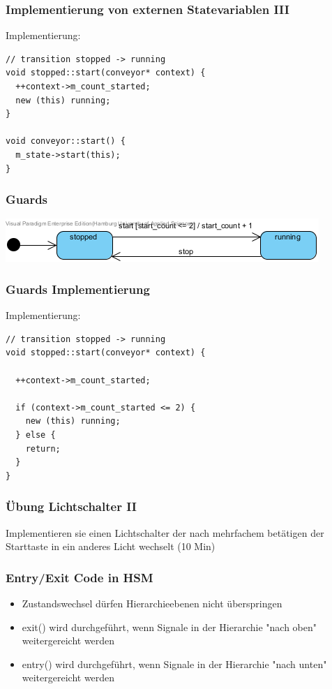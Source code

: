 \documentclass{beamer}
\begin{document}
\begin{frame}[fragile]
 \frametitle{Implementierung von externen Statevariablen III}
 Implementierung:
 \begin{lstlisting}
// transition stopped -> running
void stopped::start(conveyor* context) {
  ++context->m_count_started;
  new (this) running;
}

void conveyor::start() {
  m_state->start(this);
}
 \end{lstlisting}
\end{frame}

\begin{frame}
 \frametitle{Guards}
 \begin{center}
   \includegraphics[scale=.8]{img/fsm_gof_guard_automat.png}
 \end{center}
\end{frame}

\begin{frame}[fragile]
 \frametitle{Guards Implementierung}
 Implementierung:
 \begin{lstlisting}
// transition stopped -> running
void stopped::start(conveyor* context) {

  ++context->m_count_started;

  if (context->m_count_started <= 2) {
    new (this) running;
  } else {
    return;
  }
}
 \end{lstlisting}
\end{frame}

\begin{frame}
 \frametitle{\"Ubung Lichtschalter II}
 Implementieren sie einen Lichtschalter der nach mehrfachem bet\"atigen der Starttaste in ein anderes Licht wechselt (10 Min)
\end{frame}

\begin{frame}
 \frametitle{Entry/Exit Code in HSM }
 \begin{itemize}
  \item Zustandswechsel d\"urfen Hierarchieebenen nicht \"uberspringen
  \item exit() wird durchgef\"uhrt, wenn Signale in der Hierarchie "nach oben" weitergereicht werden
  \item entry() wird  durchgef\"uhrt, wenn Signale in der Hierarchie "nach unten" weitergereicht werden
 \end{itemize}
\end{frame}
\end{document}
